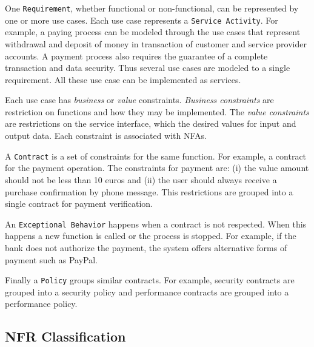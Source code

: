 \documentclass{sig-alternate}
\begin{document}


One \texttt{Requirement}, whether functional or non-functional, can be
represented by one or more use cases. 
Each use case represents a \texttt{Service
Activity}. 
For example, a paying process can be modeled through the use cases
that represent withdrawal and deposit of money in transaction of customer and
service provider accounts. A payment process also requires the guarantee of a
complete transaction and data security. Thus several use cases are modeled to a
single requirement. All these use case can be implemented as services.
% 
 
Each use case has \textit{business} or
\textit{value} constraints. \textit{Business constraints} are restriction on
functions and how they may be implemented. The \textit{value constraints} are restrictions on
the service interface, which the desired values for input and output data. Each
constraint is associated with NFAs.

A \texttt{Contract} is a set of constraints for the same function. For example,
a contract for the payment operation. The constraints for payment are: (i) the
value amount should not be less than 10 euros and (ii) the user should always
receive a purchase confirmation by phone message. This restrictions are
grouped into a single contract for payment verification. 

 
An \texttt{Exceptional Behavior} happens when a contract is not respected. When
this happens a new function is called or the process is stopped. For example, if
the bank does not authorize the payment, the system offers alternative forms
of payment such as PayPal.

Finally a \texttt{Policy} groups similar contracts. For example, security
contracts are grouped into a security policy and performance contracts are
grouped into a performance policy.


\subsection{NFR Classification}
\label{sec:nfr-classification}
\end{document}
